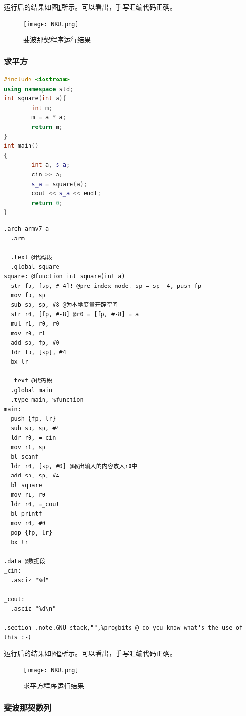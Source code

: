 \documentclass[UTF8,a4paper,10pt]{ctexart}
\begin{document}
运行后的结果如图\ref{fig:1}所示。可以看出，手写汇编代码正确。
\begin{figure}[H]
    \centering
    \texttt{[image: NKU.png]}
    \caption{斐波那契程序运行结果}
    \label{fig:1}
\end{figure}
\subsubsection{求平方}
\begin{lstlisting}[language = c++, title = 源程序]
#include <iostream>
using namespace std;
int square(int a){
        int m;
        m = a * a;
        return m;
}
int main()
{
        int a, s_a;
        cin >> a;
        s_a = square(a);
        cout << s_a << endl;
        return 0;
}
\end{lstlisting}
\begin{lstlisting}[title = 改写后的汇编代码]
.arch armv7-a
  .arm

  .text @代码段
  .global square
square: @function int square(int a)
  str fp, [sp, #-4]! @pre-index mode, sp = sp -4, push fp
  mov fp, sp
  sub sp, sp, #8 @为本地变量开辟空间
  str r0, [fp, #-8] @r0 = [fp, #-8] = a
  mul r1, r0, r0
  mov r0, r1
  add sp, fp, #0
  ldr fp, [sp], #4
  bx lr

  .text @代码段
  .global main
  .type main, %function
main:
  push {fp, lr}
  sub sp, sp, #4
  ldr r0, =_cin
  mov r1, sp
  bl scanf
  ldr r0, [sp, #0] @取出输入的内容放入r0中
  add sp, sp, #4
  bl square
  mov r1, r0
  ldr r0, =_cout
  bl printf
  mov r0, #0
  pop {fp, lr}
  bx lr

.data @数据段
_cin:
  .asciz "%d"

_cout:
  .asciz "%d\n"

.section .note.GNU-stack,"",%progbits @ do you know what's the use of this :-)

\end{lstlisting}
运行后的结果如图\ref{fig:2}所示。可以看出，手写汇编代码正确。
\begin{figure}[H]
    \centering
    \texttt{[image: NKU.png]}
    \caption{求平方程序运行结果}
    \label{fig:2}
\end{figure}









\subsubsection{斐波那契数列}
\end{document}
